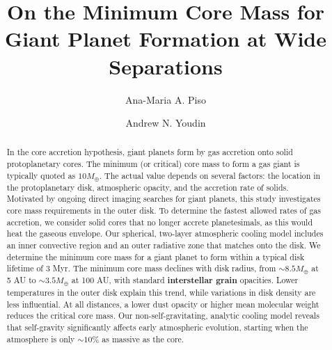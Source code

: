 \documentclass[apj, numberedappendix]{emulateapj}
\begin{document}

\title{On the Minimum Core Mass for Giant Planet Formation at Wide Separations}

\author{Ana-Maria A. Piso}

\author{Andrew N. Youdin}


\begin{abstract}

In the core accretion hypothesis, giant planets form by gas accretion onto solid protoplanetary cores.  The minimum (or critical) core mass to form a gas giant is typically quoted as $10 M_{\oplus}$. The actual value depends on several factors: the location in the protoplanetary disk, atmospheric opacity, and the accretion rate of solids. Motivated by ongoing direct imaging searches for giant planets, this study investigates core mass requirements in the outer disk.  To determine the fastest allowed rates of gas accretion, we consider solid cores that no longer accrete planetesimals, as this would heat the gaseous envelope. Our spherical, two-layer atmospheric cooling model includes an inner convective region and an outer radiative zone that matches onto the disk.  We determine the minimum core mass for a giant planet to form within a typical disk lifetime of 3 Myr.   The minimum core mass declines with disk radius, from $\sim$$8.5 M_{\oplus}$ at 5 AU to $\sim$$3.5 M_{\oplus}$ at 100 AU, with standard \textbf{interstellar grain} opacities.  Lower temperatures in the outer disk explain this trend, while variations in disk density are less influential.  At all distances, a lower dust opacity or higher mean molecular weight reduces the critical core mass. Our non-self-gravitating, analytic cooling model reveals that self-gravity significantly affects early atmospheric evolution, starting when the atmosphere is only $\sim$$10\%$ as massive as the core.


\end{abstract}
\end{document}
